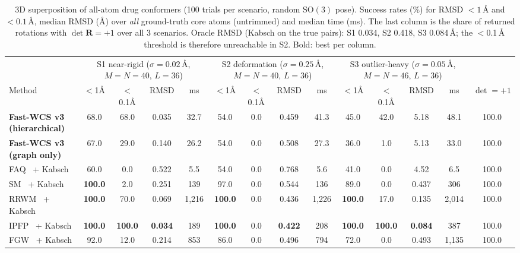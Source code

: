 \begin{table}[!t]
\centering
\caption{3D superposition of all-atom drug conformers (100 trials per scenario, random $\mathrm{SO}(3)$ pose). Success rates (\%) for RMSD $<1$\,\AA{} and $<0.1$\,\AA{}, median RMSD (\AA) over \emph{all} ground-truth core atoms (untrimmed) and median time (ms). The last column is the share of returned rotations with $\det\mathbf{R}{=}{+}1$ over all 3 scenarios. Oracle RMSD (Kabsch on the true pairs): S1 0.034, S2 0.418, S3 0.084\,\AA; the $<$0.1\,\AA{} threshold is therefore unreachable in S2. Bold: best per column.}
\label{tab:3d}
\fontsize{6.4}{7.7}\selectfont
\setlength{\tabcolsep}{2.4pt}
\begin{tabular*}{\textwidth}{@{\extracolsep{\fill}}lccccccccccccc@{}}
\toprule
 & \multicolumn{4}{c}{S1 near-rigid ($\sigma{=}0.02$\,\AA, $M{=}N{=}40$, $L{=}36$)} & \multicolumn{4}{c}{S2 deformation ($\sigma{=}0.25$\,\AA, $M{=}N{=}40$, $L{=}36$)} & \multicolumn{4}{c}{S3 outlier-heavy ($\sigma{=}0.05$\,\AA, $M{=}N{=}46$, $L{=}36$)} & \\
\cmidrule(lr){2-5}\cmidrule(lr){6-9}\cmidrule(lr){10-13}
Method & $<$1\AA & $<$0.1\AA & RMSD & ms & $<$1\AA & $<$0.1\AA & RMSD & ms & $<$1\AA & $<$0.1\AA & RMSD & ms & $\det{=}{+}1$ \\
\midrule
\textbf{Fast-WCS v3 (hierarchical)} & 68.0 & 68.0 & 0.035 & 32.7 & 54.0 & 0.0 & 0.459 & 41.3 & 45.0 & 42.0 & 5.18 & 48.1 & 100.0 \\
\textbf{Fast-WCS v3 (graph only)} & 67.0 & 29.0 & 0.140 & 26.2 & 54.0 & 0.0 & 0.508 & 27.3 & 36.0 & 1.0 & 5.13 & 33.0 & 100.0 \\
\midrule
FAQ~\cite{vogelstein2015fast} + Kabsch & 60.0 & 0.0 & 0.522 & 5.5 & 54.0 & 0.0 & 0.768 & 5.6 & 41.0 & 0.0 & 4.52 & 6.5 & 100.0 \\
SM~\cite{leordeanu2005} + Kabsch & \textbf{100.0} & 2.0 & 0.251 & 139 & 97.0 & 0.0 & 0.544 & 136 & 89.0 & 0.0 & 0.437 & 306 & 100.0 \\
RRWM~\cite{cho2010rrwm} + Kabsch & \textbf{100.0} & 70.0 & 0.069 & 1{,}216 & \textbf{100.0} & 0.0 & 0.436 & 1{,}226 & \textbf{100.0} & 17.0 & 0.135 & 2{,}014 & 100.0 \\
IPFP~\cite{leordeanu2009ipfp} + Kabsch & \textbf{100.0} & \textbf{100.0} & \textbf{0.034} & 189 & \textbf{100.0} & 0.0 & \textbf{0.422} & 208 & \textbf{100.0} & \textbf{100.0} & \textbf{0.084} & 387 & 100.0 \\
FGW~\cite{titouan2019optimal} + Kabsch & 92.0 & 12.0 & 0.214 & 853 & 86.0 & 0.0 & 0.496 & 794 & 72.0 & 0.0 & 0.493 & 1{,}135 & 100.0 \\

\end{tabular*}
\end{table}
